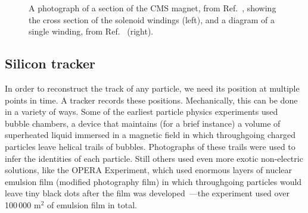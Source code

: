\begin{figure}[htb]
    \centering
    \quad
    \caption[A photograph of a section of the CMS magnet, from Ref.~\cite{CourierSolenoid}, and a diagram of a single winding, from Ref.~\cite{CERN-LHCC-97-010}]{
        A photograph of a section of the CMS magnet, from Ref.~\cite{CourierSolenoid}, showing the cross section of the solenoid windings (left), and a diagram of a single winding, from Ref.~\cite{CERN-LHCC-97-010} (right). 
    }
    \label{fig:cms_magnet}
\end{figure}

\subsection{Silicon tracker}
In order to reconstruct the track of any particle, we need its position at multiple points in time. 
A tracker records these positions. 
Mechanically, this can be done in a variety of ways. 
Some of the earliest particle physics experiments used bubble chambers, a device that maintains (for a brief instance) a volume of superheated liquid immersed in a magnetic field in which throughgoing charged particles leave helical trails of bubbles. 
Photographs of these trails were used to infer the identities of each particle. 
Still others used even more exotic non-electric solutions, like the OPERA Experiment, which used enormous layers of nuclear emulsion film (modified photography film) in which throughgoing particles would leave tiny black dots after the film was developed\footnotemark{}~\cite{Acquafredda:2009zz}---the experiment used over 100\,000 m$^2$ of emulsion film in total. 

